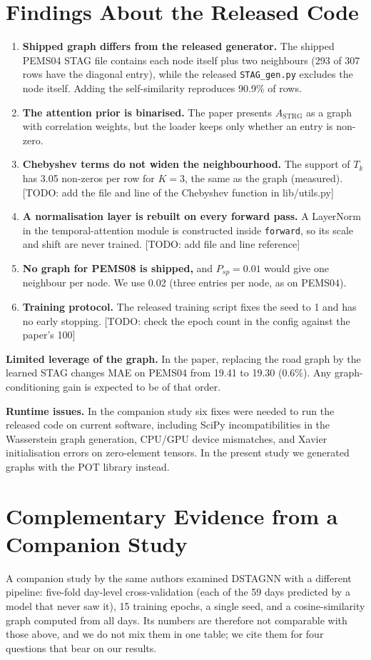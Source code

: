 \documentclass[conference]{IEEEtran}
\newcommand{\todo}[1]{{\color{red}[TODO: #1]}}
\begin{document}
\section{Findings About the Released Code}\label{sec:code}
\begin{enumerate}
\item \textbf{Shipped graph differs from the released generator.} The shipped PEMS04 STAG file contains each node itself plus two neighbours (293 of 307 rows have the diagonal entry), while the released \texttt{STAG\_gen.py} excludes the node itself. Adding the self-similarity reproduces 90.9\% of rows.
\item \textbf{The attention prior is binarised.} The paper presents $A_{\mathrm{STRG}}$ as a graph with correlation weights, but the loader keeps only whether an entry is non-zero.
\item \textbf{Chebyshev terms do not widen the neighbourhood.} The support of $T_k$ has 3.05 non-zeros per row for $K=3$, the same as the graph (measured). \todo{add the file and line of the Chebyshev function in lib/utils.py}
\item \textbf{A normalisation layer is rebuilt on every forward pass.} A LayerNorm in the temporal-attention module is constructed inside \texttt{forward}, so its scale and shift are never trained. \todo{add file and line reference}
\item \textbf{No graph for PEMS08 is shipped,} and $P_{sp}=0.01$ would give one neighbour per node. We use 0.02 (three entries per node, as on PEMS04).
\item \textbf{Training protocol.} The released training script fixes the seed to 1 and has no early stopping. \todo{check the epoch count in the config against the paper's 100}
\end{enumerate}
\textbf{Limited leverage of the graph.} In the paper, replacing the road graph by the learned STAG changes MAE on PEMS04 from 19.41 to 19.30 (0.6\%). Any graph-conditioning gain is expected to be of that order.

\textbf{Runtime issues.} In the companion study six fixes were needed to run the released code on current software, including SciPy incompatibilities in the Wasserstein graph generation, CPU/GPU device mismatches, and Xavier initialisation errors on zero-element tensors. In the present study we generated graphs with the POT library instead.

\section{Complementary Evidence from a Companion Study}\label{sec:companion}
A companion study by the same authors \cite{companion} examined DSTAGNN with a different pipeline: five-fold day-level cross-validation (each of the 59 days predicted by a model that never saw it), 15 training epochs, a single seed, and a cosine-similarity graph computed from all days. Its numbers are therefore not comparable with those above, and we do not mix them in one table; we cite them for four questions that bear on our results.
\end{document}
